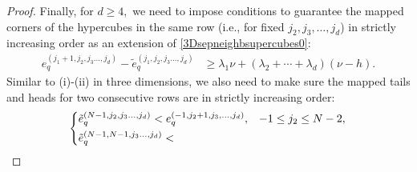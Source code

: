 \documentclass[10pt,reqno,final]{amsart}
\theoremstyle{remark}
\theoremstyle{definition}
\begin{document}
\begin{proof}
Finally, for $d\ge 4,$ we need to impose conditions to  guarantee 
the mapped corners of the hypercubes in the same row (i.e.,  for fixed $j_2, j_3,\ldots,j_d$) in strictly increasing order as an extension of \eqref{3Dsepneighbsupercubes0}:
\begin{equation}\label{eqanydd}
\begin{split}
e_q^{(j_1+1,j_2,j_3\ldots,j_d)}-\tilde e_q^{(j_1,j_2,j_3\ldots,j_d)}
&\geq \lambda_1\nu +(\lambda_2+\cdots+\lambda_d)(\nu-h).
\end{split}
\end{equation}
Similar to (i)-(ii) in three dimensions, we also need to make sure  the mapped tails and heads for two consecutive rows are in strictly increasing order:
\begin{equation*}\label{2maincondforanyd}
\begin{dcases}
\tilde e_q^{(N-1,j_2,j_3\ldots,j_d)}<
 e_q^{(-1,j_2+1,j_3,\ldots,j_d)}, & -1\le j_2\le  N-2,   \\
\tilde e_q^{(N-1,N-1,j_3\ldots,j_d)}<

\end{dcases}
\end{equation*}
\end{proof}
\end{document}
